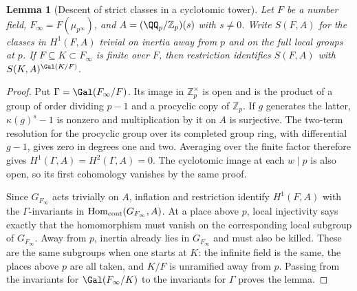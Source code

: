 \documentclass[a4paper,11pt]{article}
\newtheorem{lemma}[proposition]{Lemma}
\theoremstyle{definition}
\theoremstyle{remark}
\newcommand{\ZZ}{\mathbb Z}\newcommand{\ord}{\operatorname{ord}}
\numberwithin{equation}{section}
\begin{document}
\begin{lemma}[Descent of strict classes in a cyclotomic tower]\leavevmode
\label{lem:cyclostrict608}
Let \(F\) be a number field, \(F_\infty=F(\mu_{p^\infty})\),
and \(A=(\QQ_p/\ZZ_p)(s)\) with \(s\ne0\). Write \(S(F,A)\)
for the classes in \(H^1(F,A)\) trivial on inertia away from
\(p\) and on the full local groups at \(p\).
If \(F\subseteq K\subset F_\infty\) is finite over \(F\), then
restriction identifies \(S(F,A)\) with
\(S(K,A)^{\Gal(K/F)}\).
\end{lemma}
\begin{proof}
Put \(\Gamma=\Gal(F_\infty/F)\). Its image in \(\ZZ_p^\times\)
is open and is the product of a group of order dividing \(p-1\)
and a procyclic copy of \(\ZZ_p\). If \(g\) generates the latter,
\(\kappa(g)^s-1\) is nonzero and multiplication by it on \(A\)
is surjective. The two-term resolution for the procyclic group
over its completed group ring, with differential \(g-1\), gives
zero in degrees one and two. Averaging over the finite factor
therefore gives \(H^1(\Gamma,A)=H^2(\Gamma,A)=0\).
The cyclotomic image at each \(w\mid p\) is also open, so its
first cohomology vanishes by the same proof.

Since \(G_{F_\infty}\) acts trivially on \(A\), inflation and
restriction identify \(H^1(F,A)\) with the \(\Gamma\)-invariants
in \(\operatorname{Hom}_{\rm cont}(G_{F_\infty},A)\).
At a place above \(p\), local injectivity says exactly that the
homomorphism must vanish on the corresponding local subgroup
of \(G_{F_\infty}\). Away from \(p\), inertia already lies in
\(G_{F_\infty}\) and must also be killed. These are the same
subgroups when one starts at \(K\): the infinite field is the
same, the places above \(p\) are all taken, and \(K/F\) is
unramified away from \(p\). Passing from the invariants for
\(\Gal(F_\infty/K)\) to the invariants for \(\Gamma\) proves
the lemma.
\end{proof}
\end{document}
